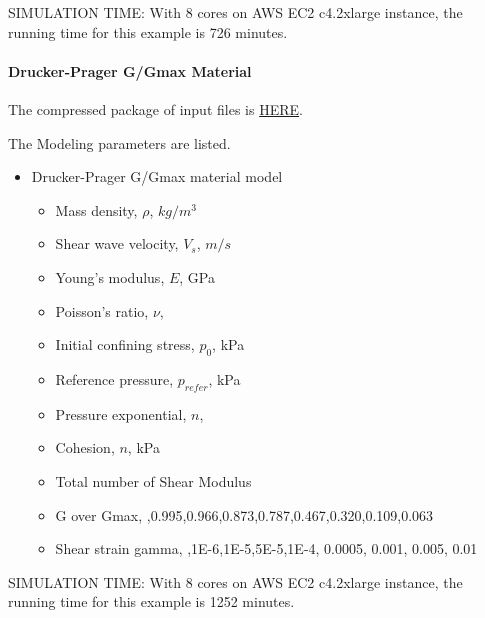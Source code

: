 SIMULATION TIME: With 8 cores on AWS EC2 c4.2xlarge instance, the running time for this example is 726 minutes.


\paragraph{Drucker-Prager G/Gmax Material}
The compressed package of input files is  
\href{https://github.com/yuan-energy/Real-ESSI-Short-Course-Examples/tree/master/short-course-examples/nonlinear_analysis_steps/soil-foundation/DruckerPragerGoverGmax/DruckerPragerGoverGmax.tgz?raw=true}{HERE}. 


The Modeling parameters are listed.
\begin{itemize}
  \item Drucker-Prager G/Gmax material model 
  \begin{itemize}
    \item Mass density, $\rho$, \enspace {} $kg/m^3$
    \item Shear wave velocity, $V_s$, \enspace {} $m/s$
    \item Young's modulus, $E$, \enspace {} GPa
    \item Poisson's ratio, $\nu$, \enspace {}
    \item Initial confining stress, $p_0$, \enspace {} kPa
    \item Reference pressure, $p_{refer} $, \enspace {} kPa
    \item Pressure exponential, $ n  $, \enspace {}
    \item Cohesion, $ n  $, \enspace {} kPa
    \item Total number of Shear Modulus \enspace {}
    \item G over Gmax, \enspace {},0.995,0.966,0.873,0.787,0.467,0.320,0.109,0.063
    \item Shear strain gamma, \enspace {},1E-6,1E-5,5E-5,1E-4, 0.0005, 0.001, 0.005, 0.01
  \end{itemize}
\end{itemize}

SIMULATION TIME: With 8 cores on AWS EC2 c4.2xlarge instance, the running time for this example is 1252 minutes.


